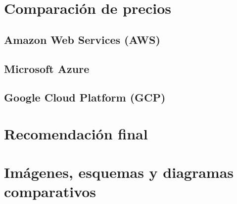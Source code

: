 \documentclass{article}
\begin{document}
\section{Comparación de precios}
  \subsection{Amazon Web Services (AWS)}
  \subsection{Microsoft Azure}
  \subsection{Google Cloud Platform (GCP)}

\section{Recomendación final}

\section{Imágenes, esquemas y diagramas comparativos}


\printbibliography
\end{document}
